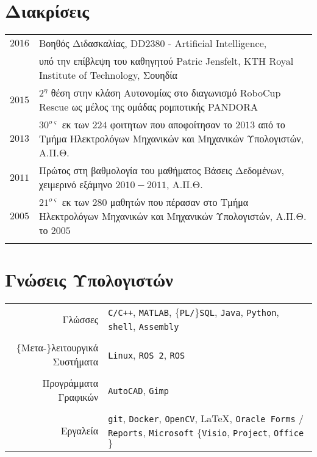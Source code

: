 \documentclass[a4paper,10pt,twoside]{article}
\begin{document}
\section{Διακρίσεις}
\begin{tabular}{rp{14cm}}

$2016$ & Βοηθός Διδασκαλίας, DD2380 - Artificial Intelligence, \\ & υπό την επίβλεψη του καθηγητού Patric Jensfelt, KTH Royal Institute of Technology, Σουηδία\\


$2015$ & $2^{\eta}$ θέση στην κλάση Αυτονομίας στο διαγωνισμό RoboCup Rescue ως μέλος της ομάδας ρομποτικής PANDORA \\


$2013$ & $30^{o\varsigma}$ εκ των $224$ φοιτητων που αποφοίτησαν το $2013$ από το Tμήμα Ηλεκτρολόγων Μηχανικών και Μηχανικών Υπολογιστών, Α.Π.Θ. \\


$2011$ & Πρώτος στη βαθμολογία του μαθήματος Βάσεις Δεδομένων, χειμερινό εξάμηνο $2010 - 2011$, Α.Π.Θ. \\


$2005$ & $21^{o\varsigma}$ εκ των $280$ μαθητών που πέρασαν στο Tμήμα Ηλεκτρολόγων Μηχανικών και Μηχανικών Υπολογιστών, Α.Π.Θ. το $2005$\\
&\\
\end{tabular}





\section{Γνώσεις Υπολογιστών}

\begin{tabular}{rp{9cm}}
  Γλώσσες & \texttt{C/C++}, \texttt{MATLAB}, $\{$\texttt{PL/}$\}$\texttt{SQL}, \texttt{Java}, \texttt{Python}, \texttt{shell}, \texttt{Assembly}\\
&\\
  $\{$Μετα-$\}$λειτουργικά Συστήματα & \texttt{Linux}, \texttt{ROS 2}, \texttt{ROS}  \\
&\\
  Προγράμματα Γραφικών & \texttt{AutoCAD}, \texttt{Gimp}\\
&\\
  Εργαλεία & \texttt{git}, \texttt{Docker}, \texttt{OpenCV}, \LaTeX, \texttt{Oracle Forms} / \texttt{Reports}, \texttt{Microsoft} $\{$\texttt{Visio}, \texttt{Project}, \texttt{Office}$\}$
\end{tabular}
\end{document}
